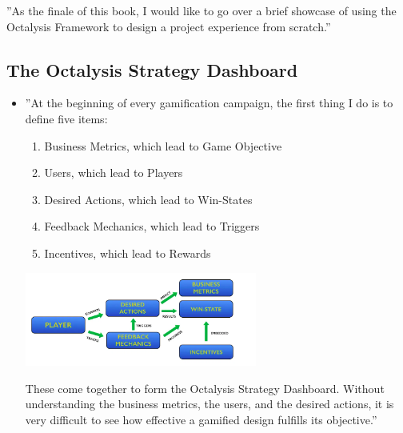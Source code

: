 ''As the finale of this book, I would like to go over a brief showcase of using the Octalysis Framework to design a project experience from scratch.''

\subsection{The Octalysis Strategy Dashboard}
\begin{itemize}
    \item ''At the beginning of every gamification campaign, the first thing I do is to define five items:
    \begin{enumerate}
        \item Business Metrics, which lead to Game Objective
        \item Users, which lead to Players
        \item Desired Actions, which lead to Win-States
        \item Feedback Mechanics, which lead to Triggers
        \item Incentives, which lead to Rewards
    \end{enumerate}
    \begin{center}
        \includegraphics[width=0.6\textwidth]{images/Octalysis_strategy_dashboard.png}
    \end{center}
    These come together to form the Octalysis Strategy Dashboard. Without understanding the business metrics, the users, and the desired actions, it is very difficult to see how effective a gamified design fulfills its objective.''
\end{itemize}

